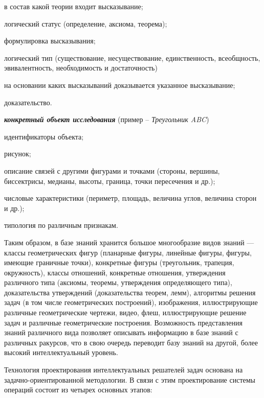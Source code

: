 \begin{textitemize}
	\item в состав какой теории входит высказывание;
	\item логический статус (определение, аксиома, теорема);
	\item формулировка высказывания;
	\item логический тип (существование, несуществование, единственность, всеобщность, эвивалентность, необходимость и достаточность)
	\item на основании каких высказываний доказывается указанное высказывание;
	\item доказательство.
\end{textitemize}

\textbf{\textit{конкретный объект исследования}} (пример -- \textit{Треугольник ABC})

\begin{textitemize}
	\item идентификаторы объекта;
	\item рисунок;
	\item описание связей с другими фигурами и точками (стороны, вершины, биссектрисы, медианы, высоты, граница, точки пересечения и др.);
	\item числовые характеристики (периметр, площадь, величина углов, величина сторон и др.);
	\item типология по различным признакам.
\end{textitemize}

Таким образом, в базе знаний хранится большое многообразие видов знаний --- классы геометрических фигур (планарные фигуры, линейные фигуры, фигуры, имеющие граничные точки), конкретные фигуры (треугольник, трапеция, окружность), классы отношений, конкретные отношения, утверждения различного типа (аксиомы, теоремы, утверждения определяющего типа), доказательства утверждений (доказательства теорем, лемм), алгоритмы решения задач (в том числе геометрических построений), изображения, иллюстрирующие различные геометрические чертежи, видео, флеш, иллюстрирующие решение задач и различные геометрические построения. Возможность представления знаний различного вида позволяет описывать информацию в базе знаний с различных ракурсов, что в свою очередь переводит базу знаний на другой, более высокий интеллектуальный уровень.

Технология проектирования интеллектуальных решателей задач основана на задачно-ориентированной методологии. В связи с этим проектирование системы операций состоит из четырех основных этапов:

